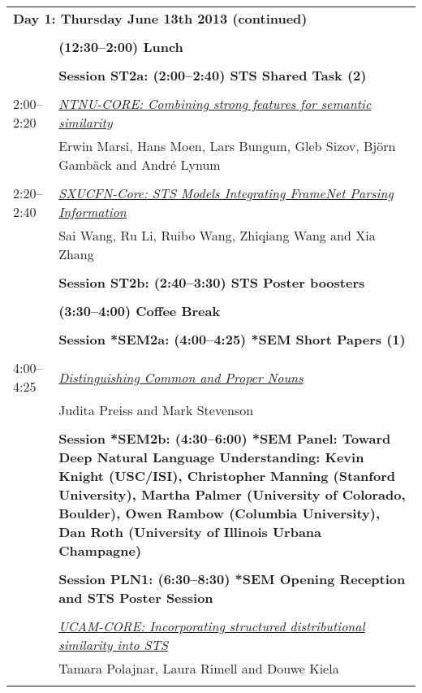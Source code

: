 \newpage
\begin{tabular}{p{20mm}p{138mm}}
\\
\multicolumn{2}{l}{\bf Day 1: Thursday June 13th 2013 (continued)} \\\\
 & {\bf (12:30--2:00) Lunch} \\
\\
 & {\bf Session ST2a: (2:00--2:40) STS Shared Task (2)} \\
\\
2:00--2:20 & \hyperlink{page.66}{\em NTNU-CORE: Combining strong features for semantic similarity}\\
         & Erwin Marsi, Hans Moen, Lars Bungum, Gleb Sizov, Bj\"{o}rn Gamb\"{a}ck and Andr\'{e} Lynum \\
\\

2:20--2:40 & \hyperlink{page.74}{\em SXUCFN-Core: STS Models Integrating FrameNet Parsing Information}\\
         & Sai Wang, Ru Li, Ruibo Wang, Zhiqiang Wang and Xia Zhang \\
\\

 & {\bf Session ST2b: (2:40--3:30) STS Poster boosters} \\
\\
 & {\bf (3:30--4:00) Coffee Break} \\
\\
 & {\bf Session *SEM2a: (4:00--4:25) *SEM Short Papers (1)} \\
\\
4:00--4:25 & \hyperlink{page.80}{\em Distinguishing Common and Proper Nouns}\\
         & Judita Preiss and Mark Stevenson \\
\\

 & {\bf Session *SEM2b: (4:30--6:00) *SEM Panel: Toward Deep Natural Language Understanding: Kevin Knight (USC/ISI), Christopher Manning (Stanford University), Martha Palmer (University of Colorado, Boulder), Owen Rambow (Columbia University), Dan Roth (University of Illinois Urbana Champagne)} \\
\\
 & {\bf Session PLN1: (6:30--8:30) *SEM Opening Reception and STS Poster Session} \\
\\
 & \hyperlink{page.85}{\em UCAM-CORE: Incorporating structured distributional similarity into STS}\\
         & Tamara Polajnar, Laura Rimell and Douwe Kiela \\
\\


\end{tabular}
